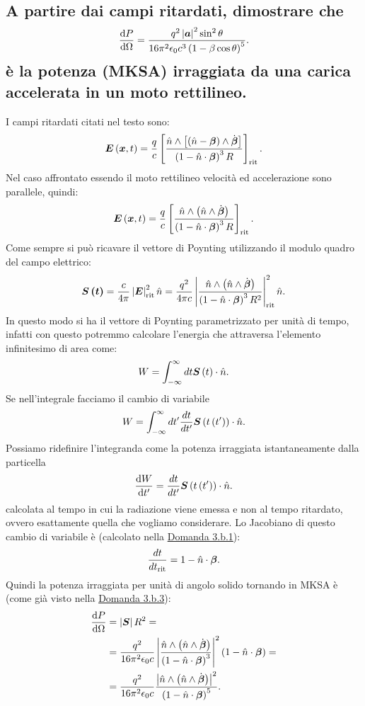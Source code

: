 \subsection[]{A partire dai campi ritardati, dimostrare che 
\[
	\frac{\mbox{d} P}{\mbox{d} \Omega} = \frac{q^2\left| \boldsymbol{a} \right|^2\sin^2\theta }{16\pi^2\epsilon_0c^3\left( 1-\beta\cos\theta \right)^5 }
.\] è la potenza (MKSA) irraggiata da una carica accelerata in un moto rettilineo.}
\label{sec:3.b.20}
I campi ritardati citati nel testo sono:
\[
	\boldsymbol{E}\left( \boldsymbol{x},t \right)= \frac{q}{c} \left[ \frac{\hat{n}\wedge \left[ \left( \hat{n}-\boldsymbol{\beta} \right) \wedge \dot{\boldsymbol{\beta}}  \right] }
	{\left( 1-\hat{n}\cdot \boldsymbol{\beta} \right)^3 R}  \right]_{\text{rit}} 
.\] 
Nel caso affrontato essendo il moto rettilineo velocità ed accelerazione sono parallele, quindi:
\[
	\boldsymbol{E}\left( \boldsymbol{x},t \right)= \frac{q}{c} \left[ \frac{\hat{n}\wedge \left( \hat{n}  \wedge \dot{\boldsymbol{\beta}}  \right) }
	{\left( 1-\hat{n}\cdot \boldsymbol{\beta} \right)^3 R}  \right]_{\text{rit}} 
.\] 
Come sempre si può ricavare il vettore di Poynting utilizzando il modulo quadro del campo elettrico:
\[
	\boldsymbol{S\left( t \right) }= \frac{c}{4 \pi }\left| \boldsymbol{E} \right|^2_{\text{rit}} \hat{n} = 
	\frac{q^2}{4 \pi c}\left|  \frac{\hat{n}\wedge \left( \hat{n}  \wedge \dot{\boldsymbol{\beta}}  \right) }{\left( 1-\hat{n}\cdot \boldsymbol{\beta} \right)^3 R^2} \right|^2_{\text{rit}} \hat{n}
.\] 
In questo modo si ha il vettore di Poynting parametrizzato per unità di tempo, infatti con questo potremmo calcolare l'energia che attraversa l'elemento infinitesimo di area come:
\[
	W= \int_{-\infty}^{\infty} dt \boldsymbol{S}\left( t \right) \cdot \hat{n}
.\] 
Se nell'integrale facciamo il cambio di variabile
\[
	W= \int_{-\infty}^{\infty} dt' \frac{dt}{dt'} \boldsymbol{S}\left( t\left( t' \right)  \right) \cdot \hat{n}
.\]
Possiamo ridefinire l'integranda come la potenza irraggiata istantaneamente dalla particella
\[
	\frac{\mbox{d} W}{\mbox{d} t'}= \frac{dt}{dt'} \boldsymbol{S}\left( t\left( t' \right)  \right) \cdot \hat{n} 
.\] 
calcolata al tempo in cui la radiazione viene emessa e non al tempo ritardato, ovvero esattamente quella che vogliamo considerare. 
Lo Jacobiano di questo cambio di variabile è (calcolato nella \hyperref[sec:3.b.1]{Domanda 3.b.1}):
\[
	\frac{dt}{dt_{\text{rit}}}= 1- \hat{n}\cdot \boldsymbol{\beta}
.\] 
Quindi la potenza irraggiata per unità di angolo solido tornando in MKSA è (come già visto nella \hyperref[sec:3.b.3]{Domanda 3.b.3}): 
\begin{align*}
	\frac{\mbox{d} P}{\mbox{d} \Omega} &= \left| \boldsymbol{S} \right| R^2 =\\
	&=  \frac{q^2}{16\pi^2\epsilon_0 c} \left|  \frac{\hat{n}\wedge \left( \hat{n}  \wedge \dot{\boldsymbol{\beta}}  \right) }{\left( 1-\hat{n}\cdot \boldsymbol{\beta} \right)^3 } \right|^2\left( 1-\hat{n}\cdot \boldsymbol{\beta} \right) =\\
	&=  \frac{q^2}{16\pi^2\epsilon_0 c} \frac{\left| \hat{n}\wedge \left( \hat{n}\wedge \dot{\boldsymbol{\beta}}  \right)   \right|^2 }{\left( 1-\hat{n}\cdot \boldsymbol{\beta} \right)^{5} }
.\end{align*}
